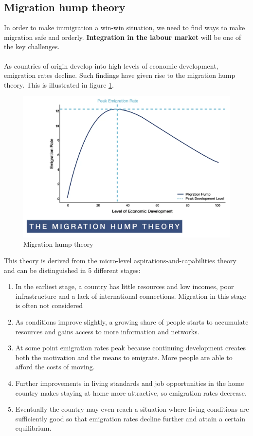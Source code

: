 \documentclass[../summary.tex]{subfiles}
\begin{document}
\subsection{Migration hump theory}
In order to make immigration a win-win situation, we need to find ways to make migration safe and orderly. \textbf{Integration in the labour market} will be one of the key challenges.
\\\\
As countries of origin develop into high levels of economic development, emigration rates decline. Such findings have given rise to the migration hump theory. This is illustrated in figure \ref{fig:hump}.
\begin{figure}[h]
	\centering
	\includegraphics[width=0.7\linewidth]{../images/7-hump}
	\caption{Migration hump theory}
	\label{fig:hump}
\end{figure}
This theory is derived from the micro-level aspirations-and-capabilities theory and can be distinguished in 5 different stages:
\begin{enumerate}
	\item In the earliest stage, a country has little resources and low incomes, poor infrastructure and a lack of international connections. Migration in this stage is often not considered
	\item As conditions improve slightly, a growing share of people starts to accumulate resources and gains access to more information and networks.
	\item At some point emigration rates peak because continuing development creates both the motivation and the means to emigrate. More people are able to afford the costs of moving.
	\item Further improvements in living standards and job opportunities in the home country makes staying at home more attractive, so emigration rates decrease.
	\item Eventually the country may even reach a situation where living conditions are sufficiently good so that emigration rates decline further and attain a certain equilibrium.
\end{enumerate}
\end{document}
